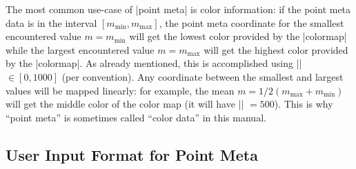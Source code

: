 The most common use-case of |point meta| is color information: if the point meta data is in the interval $[m_{\text{min}},m_{\text{max}}]$, the point meta coordinate for the smallest encountered value $m = m_{\text{min}}$ will get the lowest color provided by the |colormap| while the largest encountered value $m=m_{\text{max}}$ will get the highest color provided by the |colormap|. As already mentioned, this is accomplished using |\pgfplotspointmetatransformed| $\in [0,1000]$ (per convention). Any coordinate between the smallest and largest values will be mapped linearly: for example, the mean $m = 1/2 (m_{\text{max}} + m_{\text{min}})$ will get the middle color of the color map (it will have |\pgfplotspointmetatransformed| $=500$). This is why ``point meta'' is sometimes called ``color data'' in this manual.

\begin{codeexample}[]
\end{codeexample}

\subsection{User Input Format for Point Meta}


